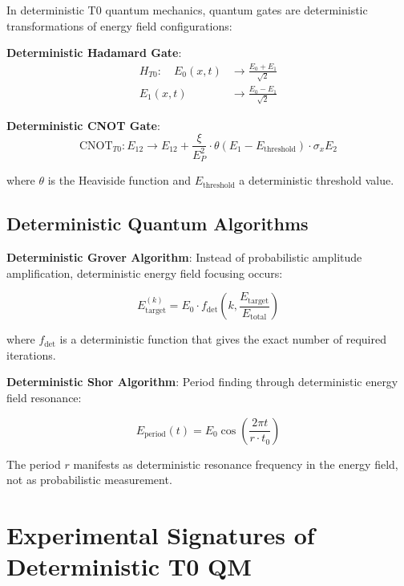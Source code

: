\documentclass[12pt,a4paper]{article}
\newcommand{\xipar}{\xi}
\newcommand{\EPlanck}{E_P}
\theoremstyle{definition}
\theoremstyle{remark}
\begin{document}
	In deterministic T0 quantum mechanics, quantum gates are deterministic transformations of energy field configurations:
	
	\textbf{Deterministic Hadamard Gate}:
	\begin{align}
		H_{T0}: \quad E_0(x,t) &\rightarrow \frac{E_0 + E_1}{\sqrt{2}} \\
		E_1(x,t) &\rightarrow \frac{E_0 - E_1}{\sqrt{2}}
	\end{align}
	
	\textbf{Deterministic CNOT Gate}:
	\begin{equation}
		\text{CNOT}_{T0}: E_{12} \rightarrow E_{12} + \frac{\xipar}{\EPlanck^2} \cdot \theta(E_1 - E_{\text{threshold}}) \cdot \sigma_x E_2
	\end{equation}
	
	where $\theta$ is the Heaviside function and $E_{\text{threshold}}$ a deterministic threshold value.
	
	\subsection{Deterministic Quantum Algorithms}
	
	\textbf{Deterministic Grover Algorithm}:
	Instead of probabilistic amplitude amplification, deterministic energy field focusing occurs:
	
	\begin{equation}
		E_{\text{target}}^{(k)} = E_0 \cdot f_{\text{det}}\left(k, \frac{E_{\text{target}}}{E_{\text{total}}}\right)
	\end{equation}
	
	where $f_{\text{det}}$ is a deterministic function that gives the exact number of required iterations.
	
	\textbf{Deterministic Shor Algorithm}:
	Period finding through deterministic energy field resonance:
	
	\begin{equation}
		E_{\text{period}}(t) = E_0 \cos\left(\frac{2\pi t}{r \cdot t_0}\right)
	\end{equation}
	
	The period $r$ manifests as deterministic resonance frequency in the energy field, not as probabilistic measurement.
	
	\section{Experimental Signatures of Deterministic T0 QM}
	
\end{document}
